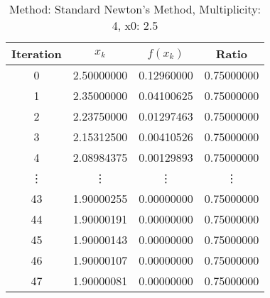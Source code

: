 \begin{table}
\centering
\caption{Method: Standard Newton's Method, Multiplicity: 4, x0: 2.5}
\label{tab:table_Standard_Newton's_Method_4_2_5}
\begin{tabular}{c c c c}
\toprule
Iteration &      $x_k$ &   $f(x_k)$ &      Ratio \\
\midrule
        0 & 2.50000000 & 0.12960000 & 0.75000000 \\
        1 & 2.35000000 & 0.04100625 & 0.75000000 \\
        2 & 2.23750000 & 0.01297463 & 0.75000000 \\
        3 & 2.15312500 & 0.00410526 & 0.75000000 \\
        4 & 2.08984375 & 0.00129893 & 0.75000000 \\
   \vdots &     \vdots &     \vdots &     \vdots \\
       43 & 1.90000255 & 0.00000000 & 0.75000000 \\
       44 & 1.90000191 & 0.00000000 & 0.75000000 \\
       45 & 1.90000143 & 0.00000000 & 0.75000000 \\
       46 & 1.90000107 & 0.00000000 & 0.75000000 \\
       47 & 1.90000081 & 0.00000000 & 0.75000000 \\
\bottomrule
\end{tabular}
\end{table}
